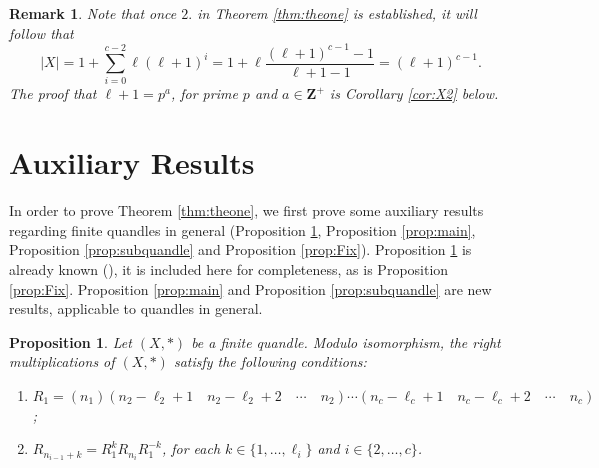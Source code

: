 \documentclass{article}
\newtheorem{proposition}[theorem]{Proposition}
\newtheorem{remark}[theorem]{Remark}
\begin{document}
\begin{remark}
Note that once $2.$ in Theorem \ref{thm:theone} is established, it will follow that $$|X|=1+\sum_{i=0}^{c-2}\ell(\ell+1)^i = 1+\ell\frac{(\ell+1)^{c-1}-1}{\ell+1-1}= (\ell+1)^{c-1} .$$The  proof that $\ell+1=p^a$, for prime $p$ and $a\in \mathbf{Z}^+$ is Corollary \ref{cor:X2}  below.
\end{remark}
\section{Auxiliary Results}\label{sctn:aux}

In order to prove Theorem \ref{thm:theone}, we first prove some auxiliary results regarding finite quandles in general (Proposition \ref{prop:assertions},  Proposition \ref{prop:main}, Proposition \ref{prop:subquandle} and Proposition \ref{prop:Fix}). Proposition \ref{prop:assertions} is already known (\cite{Lopes_Roseman}), it is included here for completeness, as is Proposition \ref{prop:Fix}.  Proposition \ref{prop:main} and Proposition \ref{prop:subquandle} are new results, applicable to quandles in general.

\begin{proposition}\label{prop:assertions}
Let $(X, *)$ be a finite quandle.
Modulo isomorphism, the right multiplications of $(X,*)$ satisfy the following conditions:
\begin{enumerate}
    \item $R_1=(n_1)(n_2-\ell_2+1\quad n_2-\ell_2+2\quad\cdots\quad n_2)\cdots(n_c-\ell_c+1\quad n_c-\ell_c+2\quad\cdots\quad n_c)$;
    \item $R_{n_{i-1}+k}=R_1^{k}R_{n_i}R_1^{-k}$, for each $k\in\{1,\dots,\ell_i\}$ and $i\in\{2,\dots,c\}$.
\end{enumerate}
\end{proposition}
\end{document}
